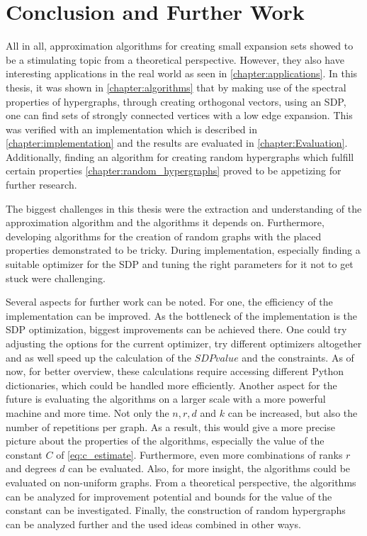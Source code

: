 \chapter{Conclusion and Further Work}\label{chapter:resmue_further_work}

All in all, approximation algorithms for creating small expansion sets showed to be a stimulating topic from a theoretical perspective. However, they also have interesting applications in the real world as seen in \cref{chapter:applications}. In this thesis, it was shown in \cref{chapter:algorithms} that by making use of the spectral properties of hypergraphs, through creating orthogonal vectors, using an SDP, one can find sets of strongly connected vertices with a low edge expansion. This was verified with an implementation which is described in \cref{chapter:implementation} and the results are evaluated in \cref{chapter:Evaluation}.
Additionally, finding an algorithm for creating random hypergraphs which fulfill certain properties \cref{chapter:random_hypergraphs} proved to be appetizing for further research.

The biggest challenges in this thesis were the extraction and understanding of the approximation algorithm and the algorithms it depends on. Furthermore, developing algorithms for the creation of random graphs with the placed properties demonstrated to be tricky. During implementation, especially finding a suitable optimizer for the SDP and tuning the right parameters for it not to get stuck were challenging.

Several aspects for further work can be noted. 
For one, the efficiency of the implementation can be improved. As the bottleneck of the implementation is the SDP optimization, biggest improvements can be achieved there. One could try adjusting the options for the current optimizer, try different optimizers altogether and as well speed up the calculation of the $SDPvalue$ and the constraints. As of now, for better overview, these calculations require accessing different Python dictionaries, which could be handled more efficiently.
Another aspect for the future is evaluating the algorithms on a larger scale with a more powerful machine and more time. Not only the $n, r, d$ and $k$ can be increased, but also the number of repetitions per graph. As a result, this would give a more precise picture about the properties of the algorithms, especially the value of the constant $C$ of \cref{eq:c_estimate}. Furthermore, even more combinations of ranks $r$ and degrees $d$ can be evaluated. Also, for more insight, the algorithms could be evaluated on non-uniform graphs. 
From a theoretical perspective, the algorithms can be analyzed for improvement potential and bounds for the value of the constant can be investigated. Finally, the construction of random hypergraphs can be analyzed further and the used ideas combined in other ways.

